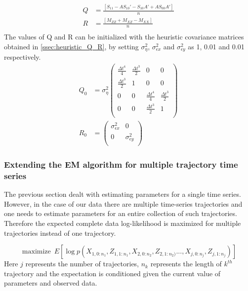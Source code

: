 \documentclass{article}
\DeclareMathOperator*{\maximize}{maximize}
\begin{document}
\begin{equation}
\begin{split}
 Q&=  \frac{[S_{11}-AS_{10}'-S_{10}A'+AS_{00}A']}{n}\\
 R&= \frac{[M_{ZZ}+M_{XZ}-M_{XX}]}{n}\\
\end{split}
\end{equation}
The values of Q and R can be initialized with the heuristic covariance matrices obtained in \ref{ssec:heuristic_Q_R}, by setting $\sigma_\eta^2$, $\sigma_{\epsilon x}^2$ and $\sigma_{\epsilon y}^2$ as 1, 0.01 and 0.01 respectively.
\begin{equation}\label{eq:init2}
\begin{split}
     Q_0 &= \sigma_\eta^2\begin{pmatrix}
    \frac{\Delta t^4}{4} & \frac{\Delta t^3}{2} & 0 & 0\\
    \frac{\Delta t^3}{2} & 1 & 0 & 0\\
    0 & 0 & \frac{\Delta t^4}{4} & \frac{\Delta t^3}{2} \\
    0 & 0 & \frac{\Delta t^3}{2} & 1\\
    \end{pmatrix}\\
    R_0 &= \begin{pmatrix}
    \sigma_{\epsilon x}^2 & 0\\
     0 & \sigma_{\epsilon y}^2\\
    \end{pmatrix}
\end{split}
\end{equation}

\subsubsection{Extending the EM algorithm for multiple trajectory time series}
The previous section dealt with estimating parameters for a single time series. However, in the case of our data there are multiple time-series trajectories and one needs to estimate parameters for an entire collection of such trajectories. Therefore the expected complete data log-likelihood is maximized for multiple trajectories instead of one trajectory.

$$\maximize \ E[\log p(X_{1,0:n_1},Z_{1,1:n_1},X_{2,0:n_2},Z_{2,1:n_2)}...,X_{j,0:n_j},Z_{j,1:n_j})] $$
Here $j$ represents the number of trajectories, $n_k$ represents the length of $k^{th}$ trajectory and the expectation is conditioned given the current value of parameters and observed data. 
\end{document}
